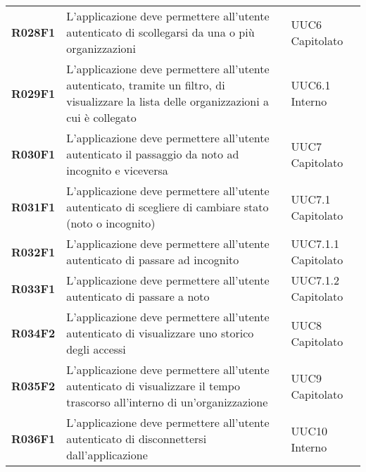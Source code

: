 \documentclass[../analisi-dei-requisiti.tex]{subfiles}
\begin{document}
\begin{longtable}[H]{>{\centering\bfseries}m{3cm} >{\centering}m{10cm} >{\centering\arraybackslash}m{3cm}}
  R028F1                               & L'applicazione deve permettere all'utente autenticato di scollegarsi da una o più organizzazioni                                                                                                        & UUC6 Capitolato               \\
  R029F1                               & L'applicazione deve permettere all'utente autenticato, tramite un filtro, di visualizzare la lista delle organizzazioni a cui è collegato                                                               & UUC6.1 Interno                \\

  R030F1                               & L'applicazione deve permettere all'utente autenticato il passaggio da noto ad incognito e viceversa                                                                                                     & UUC7 Capitolato               \\
  R031F1                               & L'applicazione deve permettere all'utente autenticato di scegliere di cambiare stato (noto o incognito)                                                                                                 & UUC7.1 Capitolato             \\
  R032F1                               & L'applicazione deve permettere all'utente autenticato di passare ad incognito                                                                                                                           & UUC7.1.1 Capitolato           \\
  R033F1                               & L'applicazione deve permettere all'utente autenticato di passare a noto                                                                                                                                 & UUC7.1.2 Capitolato           \\
  R034F2                               & L'applicazione deve permettere all'utente autenticato di visualizzare uno storico degli accessi                                                                                                         & UUC8 Capitolato               \\
  R035F2                               & L'applicazione deve permettere all'utente autenticato di visualizzare il tempo trascorso all'interno di un'organizzazione                                                                               & UUC9 Capitolato               \\
  R036F1                               & L'applicazione deve permettere all'utente autenticato di disconnettersi dall'applicazione                                                                                                               & UUC10 Interno                 \\

\end{longtable}
\end{document}
